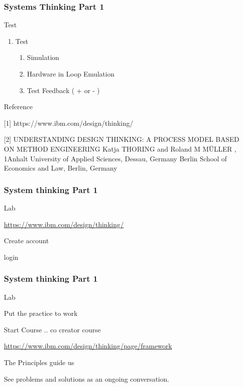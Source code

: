 \begin{frame}
\frametitle{ Systems Thinking  Part 1 }
\begin{block}{Test  }

\begin{enumerate}[6]

    \item Test
     \begin{enumerate}
         \item Simulation  
         \item  Hardware in Loop Emulation 
         \item Test Feedback  ( + or - )
     \end{enumerate}
 
\end{enumerate}

\end{block}
\end{frame}





\newpage

Reference

[1]  https://www.ibm.com/design/thinking/

[2] UNDERSTANDING DESIGN THINKING: A PROCESS  MODEL BASED ON METHOD ENGINEERING
Katja THORING   and Roland M MÜLLER , 1Anhalt University of Applied Sciences, Dessau, Germany Berlin School of Economics and Law, Berlin, Germany 



\newpage



\begin{frame}
\frametitle{ System thinking Part 1 }
\begin{block}{Lab  }

 \url{https://www.ibm.com/design/thinking/}

 

  Create account 
  
  login




\end{block}
\end{frame}


\newpage

\begin{frame}
\frametitle{ System thinking Part 1 }
\begin{block}{Lab  }


Put the practice to work

Start Course  .. co creator course 

 \url{https://www.ibm.com/design/thinking/page/framework}

 The Principles guide us
 
See problems and solutions as an ongoing conversation.




\end{block}
\end{frame}





